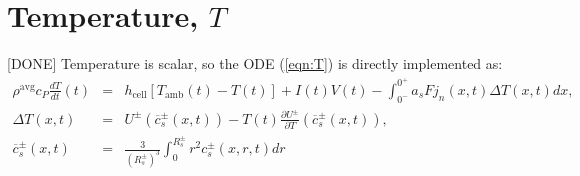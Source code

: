 \documentclass[12pt]{article}
\newcommand{\green}[1]{{\color{green}#1}}
\begin{document}
\section{Temperature, $T$}\label{sec:T}
\green{[DONE]} Temperature is scalar, so the ODE (\ref{eqn:T}) is directly implemented as:
\begin{eqnarray}
\rho^{\textrm{avg}} c_{P} \frac{dT}{dt}(t) &=& h_{\textrm{cell}} \left[ T_{\textrm{amb}}(t) - T(t) \right] + I(t) V(t) -\int_{0^{-}}^{0^{+}} a_{s} F j_{n}(x,t) \Delta T(x,t) dx, \\
\Delta T(x,t) &=& U^{\pm}(\overline{c}^{\pm}_{s}(x,t)) - T(t) \frac{\partial U^{\pm}}{\partial T}(\overline{c}^{\pm}_{s}(x,t)), \\
\overline{c}_{s}^{\pm}(x,t) &=& \frac{3}{(R_{s}^{\pm})^{3}} \int_{0}^{R_{s}^{\pm}} r^{2} c_{s}^{\pm}(x,r,t) dr 
\end{eqnarray}

\end{document}
